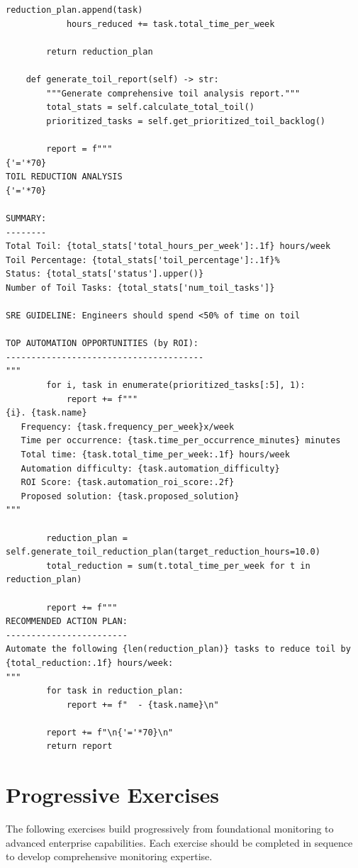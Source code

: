 \begin{lstlisting}[style=python, caption={Toil identification and reduction framework}]
            reduction_plan.append(task)
            hours_reduced += task.total_time_per_week

        return reduction_plan

    def generate_toil_report(self) -> str:
        """Generate comprehensive toil analysis report."""
        total_stats = self.calculate_total_toil()
        prioritized_tasks = self.get_prioritized_toil_backlog()

        report = f"""
{'='*70}
TOIL REDUCTION ANALYSIS
{'='*70}

SUMMARY:
--------
Total Toil: {total_stats['total_hours_per_week']:.1f} hours/week
Toil Percentage: {total_stats['toil_percentage']:.1f}%
Status: {total_stats['status'].upper()}
Number of Toil Tasks: {total_stats['num_toil_tasks']}

SRE GUIDELINE: Engineers should spend <50% of time on toil

TOP AUTOMATION OPPORTUNITIES (by ROI):
---------------------------------------
"""
        for i, task in enumerate(prioritized_tasks[:5], 1):
            report += f"""
{i}. {task.name}
   Frequency: {task.frequency_per_week}x/week
   Time per occurrence: {task.time_per_occurrence_minutes} minutes
   Total time: {task.total_time_per_week:.1f} hours/week
   Automation difficulty: {task.automation_difficulty}
   ROI Score: {task.automation_roi_score:.2f}
   Proposed solution: {task.proposed_solution}
"""

        reduction_plan = self.generate_toil_reduction_plan(target_reduction_hours=10.0)
        total_reduction = sum(t.total_time_per_week for t in reduction_plan)

        report += f"""
RECOMMENDED ACTION PLAN:
------------------------
Automate the following {len(reduction_plan)} tasks to reduce toil by {total_reduction:.1f} hours/week:
"""
        for task in reduction_plan:
            report += f"  - {task.name}\n"

        report += f"\n{'='*70}\n"
        return report
\end{lstlisting}

\section{Progressive Exercises}

The following exercises build progressively from foundational monitoring to advanced enterprise capabilities. Each exercise should be completed in sequence to develop comprehensive monitoring expertise.

